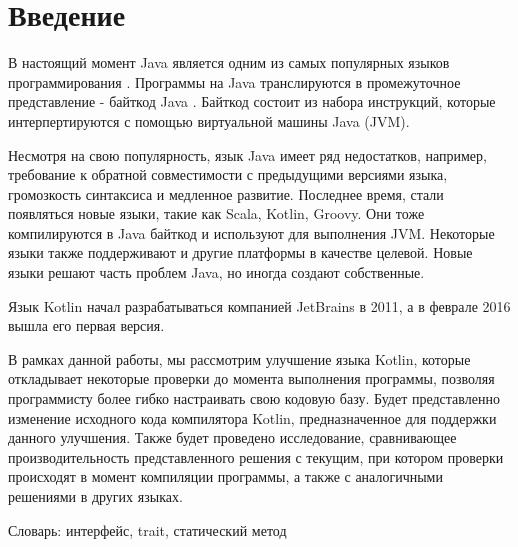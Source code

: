 \section*{Введение}

В настоящий момент Java является одним из самых популярных языков программирования \cite{online:TIOBELanguageIndex}. Программы на Java транслируются в промежуточное представление - байткод Java \cite{book:yellin1996java}. Байткод состоит из набора инструкций, которые интерпертируются с помощью виртуальной машины Java (JVM).

Несмотря на свою популярность, язык Java имеет ряд недостатков, например, требование к обратной совместимости с предыдущими версиями языка, громозкость синтаксиса и медленное развитие. Последнее время, стали появляться новые языки, такие как Scala, Kotlin, Groovy. Они тоже компилируются в Java байткод и используют для выполнения JVM. Некоторые языки также поддерживают и другие платформы в качестве целевой. Новые языки решают часть проблем Java, но иногда создают собственные.

Язык Kotlin начал разрабатываться компанией JetBrains в 2011, а в феврале 2016 вышла его первая версия.

В рамках данной работы, мы рассмотрим улучшение языка Kotlin, которые откладывает некоторые проверки до момента выполнения программы, позволяя программисту более гибко настраивать свою кодовую базу. Будет представленно изменение исходного кода компилятора Kotlin, предназначенное для поддержки данного улучшения. Также будет проведено исследование, сравнивающее производительность представленного решения с текущим, при котором проверки происходят в момент компиляции  программы, а также с аналогичными решениями в других языках.



Словарь:
интерфейс, trait, статический метод